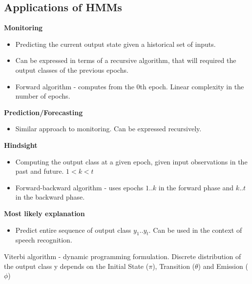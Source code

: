 \documentclass[parskip=half]{scrartcl}
\begin{document}

    \subsection{Applications of HMMs} %
    \label{sub:applications_of_hmms}

        \textbf{Monitoring}
        \begin{itemize}
            \item Predicting the current output state given a historical set of inputs.
            \item Can be expressed in terms of a recursive algorithm, that will required the output classes of the previous epochs.
            \item Forward algorithm - computes from the 0th epoch. Linear complexity in the number of epochs.
        \end{itemize}

        \textbf{Prediction/Forecasting}
        \begin{itemize}
            \item Similar approach to monitoring. Can be expressed recursively.
        \end{itemize}

        \textbf{Hindsight}
        \begin{itemize}
            \item Computing the output class at a given epoch, given input observations in the past and future. $1 < k < t$
            \item Forward-backward algorithm - uses epochs $1..k$ in the forward phase and $k..t$ in the backward phase.
        \end{itemize}

        \textbf{Most likely explanation}
        \begin{itemize}
            \item Predict entire sequence of output class $y_1..y_t$. Can be used in the context of speech recognition.
        \end{itemize}

        Viterbi algorithm - dynamic programming formulation. Discrete distribution of the output class y depends on the Initial State ($\pi$), Transition ($\theta$) and Emission ($\phi$)
\end{document}
